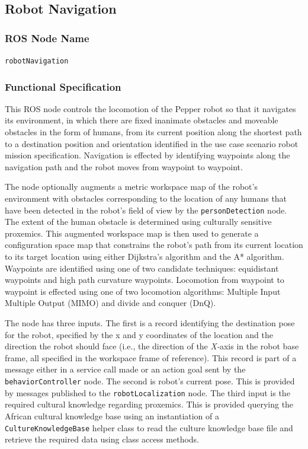 \documentclass{CSSRforAfrica}
\begin{document}
{{\newpage

\subsection{Robot Navigation }
\label{section:robot_navigation}


\subsubsection*{ROS Node Name}
 {\small \verb+robotNavigation+}   

\subsubsection*{Functional Specification}
This ROS node  controls the locomotion of the Pepper robot so that it navigates its environment, in which there are fixed inanimate obstacles and moveable obstacles in the form of humans, from its current position along the shortest path to a   destination position and orientation identified in the use case scenario robot mission specification.  Navigation is effected by identifying waypoints along the navigation path and the robot moves from waypoint to waypoint.  
 
The node optionally  augments a metric workspace map of the robot's environment with obstacles corresponding to the location of any humans that have been detected in the robot's field of view by the {\small \verb+personDetection+} node. The extent of the human obstacle is determined using culturally sensitive proxemics. This augmented workspace map is then  used to generate a configuration space map that constrains the robot's path from its current location to its target location using either Dijkstra's algorithm and the A* algorithm. Waypoints are identified using one of two candidate techniques: equidistant waypoints and high path curvature waypoints. Locomotion from waypoint to waypoint is  effected using one of two locomotion algorithms: Multiple Input Multiple Output (MIMO) and divide and conquer (DnQ).  

The node has three inputs. The first is a record identifying the destination pose for the robot, specified by the x and y coordinates of the location and the direction the robot should face (i.e., the direction of the {\em X-}axis in the robot base frame, all specified in the workspace frame of reference). This  record is part of a message either in a service call made or an action goal sent by the {\small \verb+behaviorController+} node. The second is robot's current pose. This is provided by messages published to the  {\small \verb+robotLocalization+} node. The third input is the required cultural knowledge regarding proxemics. This is provided  querying the African cultural knowledge base 
using an instantiation of a  {\small \verb+CultureKnowledgeBase+} helper class to read the culture knowledge base file and retrieve the required data using  class access methods.

}}
\end{document}
